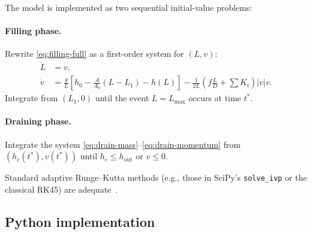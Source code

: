 \documentclass[11pt]{article}
\theoremstyle{definition}
\begin{document}
The model is implemented as two sequential initial-value problems:

\paragraph{Filling phase.}
Rewrite \eqref{eq:filling-full} as a first-order system for $(L, v)$:
\begin{align*}
  \dot{L} &= v, \\
  \dot{v} &= \frac{g}{L}\left[h_0 - \frac{A}{A_0}(L - L_1) - h(L)\right]
             - \frac{1}{2L}\left(f \frac{L}{D} + \sum K_i\right) |v| v.
\end{align*}
Integrate from $(L_1, 0)$ until the event $L = L_{\max}$ occurs at time $t^*$.

\paragraph{Draining phase.}
Integrate the system \eqref{eq:drain-mass}--\eqref{eq:drain-momentum} from 
$(h_c(t^*), v(t^*))$ until $h_c \le h_{\text{out}}$ or $v \le 0$.

Standard adaptive Runge--Kutta methods (e.g., those in SciPy's \texttt{solve\_ivp} or 
the classical RK45) are adequate~\cite{hairer}.

\subsection{Python implementation}
\end{document}
